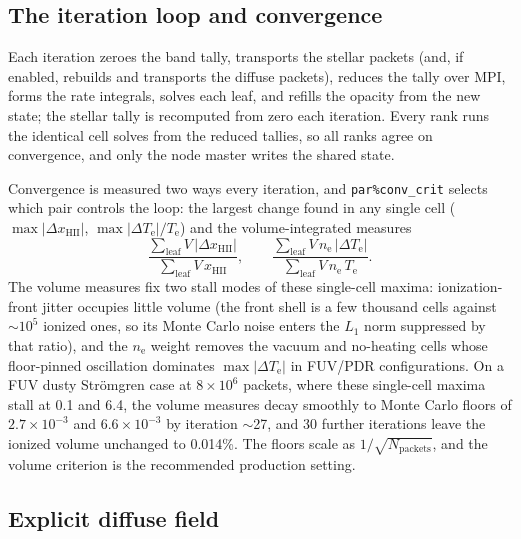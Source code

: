 \documentclass[twocolumn,linenumbers]{aastex702}
\newcommand{\code}[1]{\texttt{#1}}
\newcommand{\Te}{T_{\mathrm{e}}}
\newcommand{\nelec}{n_{\mathrm{e}}}
\begin{document}
\subsection{The iteration loop and convergence}
\label{sec:iterate}

Each iteration zeroes the band tally, transports the stellar packets
(and, if enabled, rebuilds and transports the diffuse packets), reduces
the tally over MPI, forms the rate integrals, solves each leaf, and
refills the opacity from the new state; the stellar tally is recomputed
from zero each iteration.  Every rank runs the identical cell solves from
the reduced tallies, so all ranks agree on convergence, and only the
node master writes the shared state.

Convergence is measured two ways every iteration, and
\code{par\%conv\_crit} selects which pair controls the loop: the largest
change found in any single cell ($\max|\Delta x_{\mathrm{HII}}|$,
$\max|\Delta \Te|/\Te$) and the volume-integrated measures
\begin{equation}
  \frac{\sum_{\mathrm{leaf}} V\,|\Delta x_{\mathrm{HII}}|}
       {\sum_{\mathrm{leaf}} V\,x_{\mathrm{HII}}},
  \qquad
  \frac{\sum_{\mathrm{leaf}} V\,\nelec\,|\Delta \Te|}
       {\sum_{\mathrm{leaf}} V\,\nelec\,\Te}.
\end{equation}
The volume measures fix two stall modes of these single-cell maxima:
ionization-front jitter occupies little volume (the front shell is a few
thousand cells against $\sim$$10^5$ ionized ones, so its Monte Carlo
noise enters the $L_1$ norm suppressed by that ratio), and the $\nelec$
weight removes the vacuum and no-heating cells whose floor-pinned
oscillation dominates $\max|\Delta \Te|$ in FUV/PDR configurations.  On a
FUV dusty Str\"omgren case at $8\times10^6$ packets, where these single-cell
maxima stall at 0.1 and 6.4, the volume measures decay smoothly
to Monte Carlo floors of $2.7\times10^{-3}$ and $6.6\times10^{-3}$ by
iteration $\sim$27, and 30 further iterations leave the ionized volume
unchanged to 0.014\%.  The floors scale as $1/\sqrt{N_{\mathrm{packets}}}$,
and the volume criterion is the recommended production setting.

\subsection{Explicit diffuse field}
\label{sec:diffuse}
\end{document}
